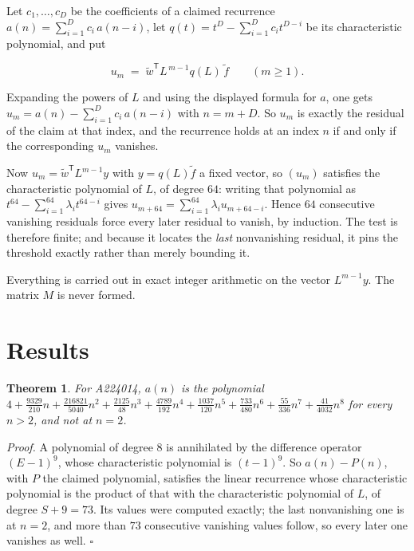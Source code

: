 \documentclass[11pt]{article}
\newtheorem{theorem}{Theorem}
\theoremstyle{definition}
\begin{document}
Let $c_1,\dots,c_D$ be the coefficients of a claimed recurrence $a(n) = \sum_{i=1}^{D} c_i\,a(n-i)$, let $q(t) = t^{D} - \sum_{i=1}^{D} c_i t^{D-i}$ be its characteristic polynomial, and put

\[u_m \;=\; \tilde w^{\mathsf T} L^{\,m-1} q(L)\,\tilde f \qquad (m \ge 1).\]

Expanding the powers of $L$ and using the displayed formula for $a$, one gets $u_m = a(n) - \sum_{i=1}^{D} c_i\,a(n-i)$ with $n = m + D$. So $u_m$ is exactly the residual of the claim at that index, and the recurrence holds at an index $n$ if and only if the corresponding $u_m$ vanishes.

Now $u_m = \tilde w^{\mathsf T} L^{m-1} y$ with $y = q(L)\tilde f$ a fixed vector, so $(u_m)$ satisfies the characteristic polynomial of $L$, of degree $64$: writing that polynomial as $t^{64} - \sum_{i=1}^{64} \lambda_i t^{64-i}$ gives $u_{m+64} = \sum_{i=1}^{64} \lambda_i u_{m+64-i}$. Hence $64$ consecutive vanishing residuals force every later residual to vanish, by induction. The test is therefore finite; and because it locates the {\itshape last} nonvanishing residual, it pins the threshold exactly rather than merely bounding it.

Everything is carried out in exact integer arithmetic on the vector $L^{m-1}y$. The matrix $M$ is never formed.

\section{Results}

\begin{theorem} For A224014, $a(n)$ is the polynomial $4 + \frac{9329}{210}n + \frac{216821}{5040}n^{2} + \frac{2125}{48}n^{3} + \frac{4789}{192}n^{4} + \frac{1037}{120}n^{5} + \frac{733}{480}n^{6} + \frac{55}{336}n^{7} + \frac{41}{4032}n^{8}$ for every $n > 2$, and not at $n = 2$.\end{theorem}

{\itshape Proof.} A polynomial of degree $8$ is annihilated by the difference operator $(E-1)^{9}$, whose characteristic polynomial is $(t-1)^{9}$. So $a(n) - P(n)$, with $P$ the claimed polynomial, satisfies the linear recurrence whose characteristic polynomial is the product of that with the characteristic polynomial of $L$, of degree $S + 9 = 73$. Its values were computed exactly; the last nonvanishing one is at $n = 2$, and more than $73$ consecutive vanishing values follow, so every later one vanishes as well. $\square$
\end{document}
